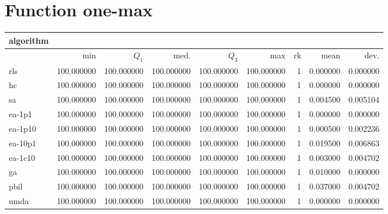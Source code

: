\section{Function one-max}
\begin{center}
\begin{tabular}{@{}l*{5}{>{{}}N{3}{0}}>{{}}N{2}{0}N{1}{3}N{1}{3}@{}}
\toprule
{algorithm} &  &  \\
\midrule
& {min} & {$Q_1$} & {med.} & {$Q_3$} & {max} & {rk} & {mean} & {dev.} \\
\midrule
rls & {\color{blue}} 100.000000 & {\color{blue}} 100.000000 & {\color{blue}} 100.000000 & {\color{blue}} 100.000000 & {\color{blue}} 100.000000 & 1 & 0.000000 & 0.000000 \\
 hc & {\color{blue}} 100.000000 & {\color{blue}} 100.000000 & {\color{blue}} 100.000000 & {\color{blue}} 100.000000 & {\color{blue}} 100.000000 & 1 & 0.000000 & 0.000000 \\
 sa & {\color{blue}} 100.000000 & {\color{blue}} 100.000000 & {\color{blue}} 100.000000 & {\color{blue}} 100.000000 & {\color{blue}} 100.000000 & 1 & 0.004500 & 0.005104 \\
 ea-1p1 & {\color{blue}} 100.000000 & {\color{blue}} 100.000000 & {\color{blue}} 100.000000 & {\color{blue}} 100.000000 & {\color{blue}} 100.000000 & 1 & 0.000000 & 0.000000 \\
 ea-1p10 & {\color{blue}} 100.000000 & {\color{blue}} 100.000000 & {\color{blue}} 100.000000 & {\color{blue}} 100.000000 & {\color{blue}} 100.000000 & 1 & 0.000500 & 0.002236 \\
 ea-10p1 & {\color{blue}} 100.000000 & {\color{blue}} 100.000000 & {\color{blue}} 100.000000 & {\color{blue}} 100.000000 & {\color{blue}} 100.000000 & 1 & 0.019500 & 0.006863 \\
 ea-1c10 & {\color{blue}} 100.000000 & {\color{blue}} 100.000000 & {\color{blue}} 100.000000 & {\color{blue}} 100.000000 & {\color{blue}} 100.000000 & 1 & 0.003000 & 0.004702 \\
 ga & {\color{blue}} 100.000000 & {\color{blue}} 100.000000 & {\color{blue}} 100.000000 & {\color{blue}} 100.000000 & {\color{blue}} 100.000000 & 1 & 0.010000 & 0.000000 \\
 pbil & {\color{blue}} 100.000000 & {\color{blue}} 100.000000 & {\color{blue}} 100.000000 & {\color{blue}} 100.000000 & {\color{blue}} 100.000000 & 1 & 0.037000 & 0.004702 \\
 umda & {\color{blue}} 100.000000 & {\color{blue}} 100.000000 & {\color{blue}} 100.000000 & {\color{blue}} 100.000000 & {\color{blue}} 100.000000 & 1 & 0.000000 & 0.000000 \\
 \bottomrule
\end{tabular}
\end{center}

